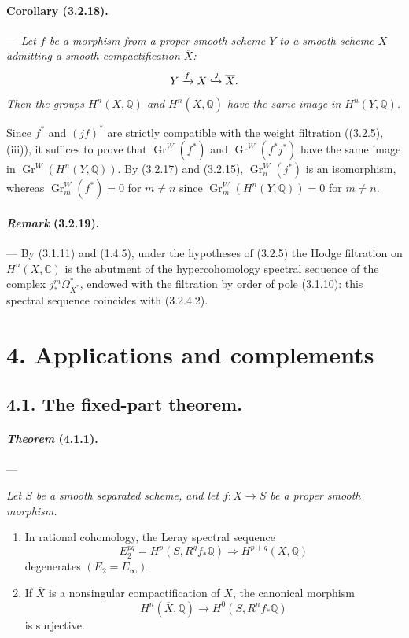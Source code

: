 \documentclass[10pt]{article}
\newcommand{\C}{\mathbb C}
\newcommand{\Q}{\mathbb Q}
\newcommand{\Gr}{\operatorname{Gr}}
\begin{document}
\paragraph{Corollary (3.2.18).} --- {\itshape Let $f$ be a morphism from a proper smooth scheme $Y$ to a smooth scheme $X$ admitting a smooth compactification $\overline X$:
\[
Y\xrightarrow{f}X\xhookrightarrow{j}\overline X.
\]
Then the groups $H^n(X,\Q)$ and $H^n(\overline X,\Q)$ have the same image in $H^n(Y,\Q)$.}

Since $f^*$ and $(jf)^*$ are strictly compatible with the weight filtration ((3.2.5), (iii)), it suffices to prove that $\Gr^W(f^*)$ and $\Gr^W(f^*j^*)$ have the same image in $\Gr^W(H^n(Y,\Q))$. By (3.2.17) and (3.2.15), $\Gr_n^W(j^*)$ is an isomorphism, whereas $\Gr_m^W(f^*)=0$ for $m\ne n$ since $\Gr_m^W(H^n(Y,\Q))=0$ for $m\ne n$.

\paragraph{\emph{Remark} (3.2.19).} --- By (3.1.11) and (1.4.5), under the hypotheses of (3.2.5) the Hodge filtration on $H^n(X,\C)$ is the abutment of the hypercohomology spectral sequence of the complex $j_*^m\Omega_{X^*}^{*}$, endowed with the filtration by order of pole (3.1.10): this spectral sequence coincides with (3.2.4.2).

\section*{4. Applications and complements}

\subsection*{4.1. The fixed-part theorem.}

\paragraph{\emph{Theorem} (4.1.1).} --- {\itshape Let $S$ be a smooth separated scheme, and let $f:X\to S$ be a proper smooth morphism.
\begin{enumerate}[label=(\roman*),font=\itshape]
\item In rational cohomology, the Leray spectral sequence
\[
E_2^{pq}=H^p(S,R^qf_*\Q)\Longrightarrow H^{p+q}(X,\Q)
\]
degenerates $(E_2=E_\infty)$.
\item If $\overline X$ is a nonsingular compactification of $X$, the canonical morphism
\[
H^n(\overline X,\Q)\longrightarrow H^0(S,R^nf_*\Q)
\]
is surjective.
\end{enumerate}}
\end{document}
